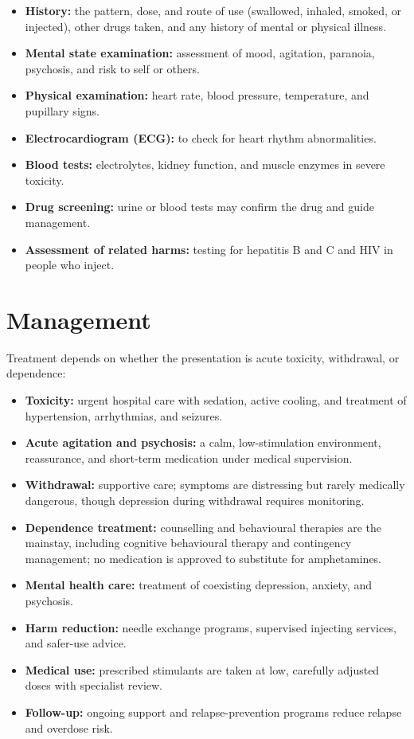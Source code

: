 \begin{itemize}
    \item \textbf{History:} the pattern, dose, and route of use (swallowed, inhaled, smoked, or injected), other drugs taken, and any history of mental or physical illness.
    \item \textbf{Mental state examination:} assessment of mood, agitation, paranoia, psychosis, and risk to self or others.
    \item \textbf{Physical examination:} heart rate, blood pressure, temperature, and pupillary signs.
    \item \textbf{Electrocardiogram (ECG):} to check for heart rhythm abnormalities.
    \item \textbf{Blood tests:} electrolytes, kidney function, and muscle enzymes in severe toxicity.
    \item \textbf{Drug screening:} urine or blood tests may confirm the drug and guide management.
    \item \textbf{Assessment of related harms:} testing for hepatitis B and C and HIV in people who inject.
\end{itemize}

\section*{Management}
Treatment depends on whether the presentation is acute toxicity, withdrawal, or dependence:

\begin{itemize}
    \item \textbf{Toxicity:} urgent hospital care with sedation, active cooling, and treatment of hypertension, arrhythmias, and seizures.
    \item \textbf{Acute agitation and psychosis:} a calm, low-stimulation environment, reassurance, and short-term medication under medical supervision.
    \item \textbf{Withdrawal:} supportive care; symptoms are distressing but rarely medically dangerous, though depression during withdrawal requires monitoring.
    \item \textbf{Dependence treatment:} counselling and behavioural therapies are the mainstay, including cognitive behavioural therapy and contingency management; no medication is approved to substitute for amphetamines.
    \item \textbf{Mental health care:} treatment of coexisting depression, anxiety, and psychosis.
    \item \textbf{Harm reduction:} needle exchange programs, supervised injecting services, and safer-use advice.
    \item \textbf{Medical use:} prescribed stimulants are taken at low, carefully adjusted doses with specialist review.
    \item \textbf{Follow-up:} ongoing support and relapse-prevention programs reduce relapse and overdose risk.
\end{itemize}


